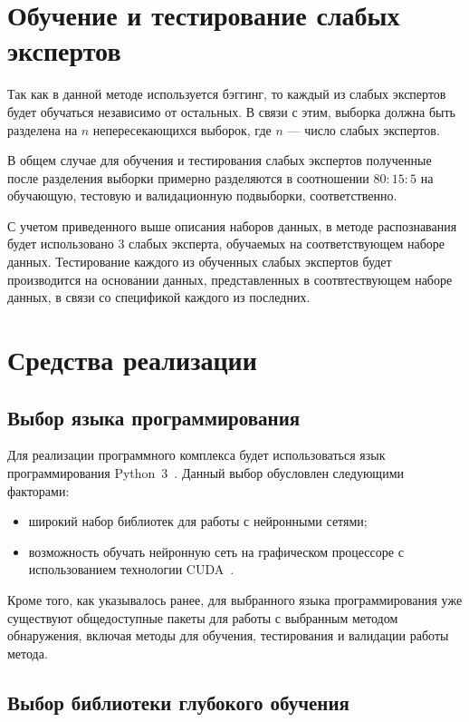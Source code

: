 \section{Обучение и тестирование слабых экспертов}

Так как в данной методе используется бэггинг, то каждый из слабых экспертов будет обучаться независимо от остальных. В связи с этим, выборка должна быть разделена на $n$ непересекающихся выборок, где $n$ --- число слабых экспертов.

В общем случае для обучения и тестирования слабых экспертов полученные после разделения выборки примерно разделяются в соотношении $80:15:5$ на обучающую, тестовую и валидационную подвыборки, соответственно.

С учетом приведенного выше описания наборов данных, в методе распознавания будет использовано 3 слабых эксперта, обучаемых на соответствующем наборе данных. Тестирование каждого из обученных слабых экспертов будет производится на основании данных, представленных в соотвтествующем наборе данных, в связи со спецификой каждого из последних.

\section{Средства реализации}

\subsection*{Выбор языка программирования}

Для реализации программного комплекса будет использоваться язык программирования Python~3~\cite{python3}. Данный выбор обусловлен следующими факторами:
\begin{itemize}[label=---]
    \item широкий набор библиотек для работы с нейронными сетями;
    \item возможность обучать нейронную сеть на графическом процессоре с
использованием технологии CUDA~\cite{cuda}.
\end{itemize}

Кроме того, как указывалось ранее, для выбранного языка программирования уже существуют общедоступные пакеты для работы с выбранным методом обнаружения, включая методы для обучения, тестирования и валидации работы метода.

\subsection*{Выбор библиотеки глубокого обучения}

